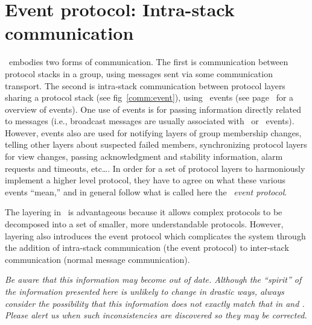 \newcommand {\eventtype}[2]	{\item {#1:} #2}

\newenvironment{EventType}{%
\begin{itemize}
}{\end{itemize}
}

\newcommand {\chainentry}[2]	{#1 & #2 \\ \hline}

\newenvironment{ChainTable}{%
\begin{quote}\begin{tabular}{|l|l|} \hline
}{\end{tabular}\end{quote}
}

\section{Event protocol: Intra-stack communication}
\label{event:protocol}
\ensemble\ embodies two forms of communication.  The first is communication
between protocol stacks in a group, using messages sent via some
communication transport.  The second is intra-stack communication between
protocol layers sharing a protocol stack (see fig~\ref{comm:event}), using
\ensemble\ events (see page~\pageref{event:module} for a overview of \ensemble
events).  One use of events is for passing information directly related to
messages (i.e., broadcast messages are usually associated with \UpCast\ or
\DnCast\ events).  However, events also are used for notifying layers of
group membership changes, telling other layers about suspected failed
members, synchronizing protocol layers for view changes, passing
acknowledgment and stability information, alarm requests and timeouts,
etc\ldots.  In order for a set of protocol layers to harmoniously implement
a higher level protocol, they have to agree on what these various events
``mean,'' and in general follow what is called here the \ensemble\ \emph{event
protocol}.

The layering in \ensemble\ is advantageous because it allows complex protocols
to be decomposed into a set of smaller, more understandable protocols.
However, layering also introduces the event protocol which complicates the
system through the addition of intra-stack communication (the event
protocol) to inter-stack communication (normal message communication).

\emph{Be aware that this information may become out of date.  Although the
``spirit'' of the information presented here is unlikely to change in
drastic ways, always consider the possibility that this information does
not exactly match that in  and .
Please alert us when such inconsistencies are discovered so they may be
corrected.}

